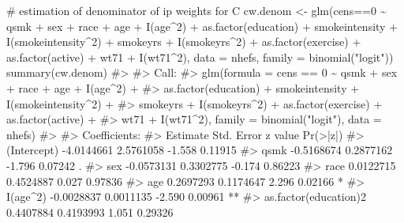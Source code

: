 \documentclass[
  10pt,
  a4paper,
]{book}
\newenvironment{Shaded}{\begin{snugshade}}{\end{snugshade}}
\newcommand{\AttributeTok}[1]{\textcolor[rgb]{0.40,0.45,0.13}{#1}}
\newcommand{\CommentTok}[1]{\textcolor[rgb]{0.37,0.37,0.37}{#1}}
\newcommand{\DecValTok}[1]{\textcolor[rgb]{0.68,0.00,0.00}{#1}}
\newcommand{\FunctionTok}[1]{\textcolor[rgb]{0.28,0.35,0.67}{#1}}
\newcommand{\NormalTok}[1]{\textcolor[rgb]{0.00,0.46,0.62}{#1}}
\newcommand{\OtherTok}[1]{\textcolor[rgb]{0.00,0.46,0.62}{#1}}
\newcommand{\SpecialCharTok}[1]{\textcolor[rgb]{0.37,0.37,0.37}{#1}}
\newcommand{\StringTok}[1]{\textcolor[rgb]{0.13,0.47,0.30}{#1}}
\begin{document}
\begin{Shaded}
\begin{Highlighting}[]
\CommentTok{\# estimation of denominator of ip weights for C}
\NormalTok{cw.denom }\OtherTok{\textless{}{-}} \FunctionTok{glm}\NormalTok{(cens}\SpecialCharTok{==}\DecValTok{0} \SpecialCharTok{\textasciitilde{}}\NormalTok{ qsmk }\SpecialCharTok{+}\NormalTok{ sex }\SpecialCharTok{+}\NormalTok{ race }\SpecialCharTok{+}\NormalTok{ age }\SpecialCharTok{+} \FunctionTok{I}\NormalTok{(age}\SpecialCharTok{\^{}}\DecValTok{2}\NormalTok{)}
                     \SpecialCharTok{+} \FunctionTok{as.factor}\NormalTok{(education) }\SpecialCharTok{+}\NormalTok{ smokeintensity }\SpecialCharTok{+} \FunctionTok{I}\NormalTok{(smokeintensity}\SpecialCharTok{\^{}}\DecValTok{2}\NormalTok{)}
                     \SpecialCharTok{+}\NormalTok{ smokeyrs }\SpecialCharTok{+} \FunctionTok{I}\NormalTok{(smokeyrs}\SpecialCharTok{\^{}}\DecValTok{2}\NormalTok{) }\SpecialCharTok{+} \FunctionTok{as.factor}\NormalTok{(exercise)}
                     \SpecialCharTok{+} \FunctionTok{as.factor}\NormalTok{(active) }\SpecialCharTok{+}\NormalTok{ wt71 }\SpecialCharTok{+} \FunctionTok{I}\NormalTok{(wt71}\SpecialCharTok{\^{}}\DecValTok{2}\NormalTok{),}
                     \AttributeTok{data =}\NormalTok{ nhefs, }\AttributeTok{family =} \FunctionTok{binomial}\NormalTok{(}\StringTok{"logit"}\NormalTok{))}
\FunctionTok{summary}\NormalTok{(cw.denom)}
\CommentTok{\#\textgreater{} }
\CommentTok{\#\textgreater{} Call:}
\CommentTok{\#\textgreater{} glm(formula = cens == 0 \textasciitilde{} qsmk + sex + race + age + I(age\^{}2) + }
\CommentTok{\#\textgreater{}     as.factor(education) + smokeintensity + I(smokeintensity\^{}2) + }
\CommentTok{\#\textgreater{}     smokeyrs + I(smokeyrs\^{}2) + as.factor(exercise) + as.factor(active) + }
\CommentTok{\#\textgreater{}     wt71 + I(wt71\^{}2), family = binomial("logit"), data = nhefs)}
\CommentTok{\#\textgreater{} }
\CommentTok{\#\textgreater{} Coefficients:}
\CommentTok{\#\textgreater{}                         Estimate Std. Error z value Pr(\textgreater{}|z|)   }
\CommentTok{\#\textgreater{} (Intercept)           {-}4.0144661  2.5761058  {-}1.558  0.11915   }
\CommentTok{\#\textgreater{} qsmk                  {-}0.5168674  0.2877162  {-}1.796  0.07242 . }
\CommentTok{\#\textgreater{} sex                   {-}0.0573131  0.3302775  {-}0.174  0.86223   }
\CommentTok{\#\textgreater{} race                   0.0122715  0.4524887   0.027  0.97836   }
\CommentTok{\#\textgreater{} age                    0.2697293  0.1174647   2.296  0.02166 * }
\CommentTok{\#\textgreater{} I(age\^{}2)              {-}0.0028837  0.0011135  {-}2.590  0.00961 **}
\CommentTok{\#\textgreater{} as.factor(education)2  0.4407884  0.4193993   1.051  0.29326   }

\end{Highlighting}
\end{Shaded}
\end{document}
